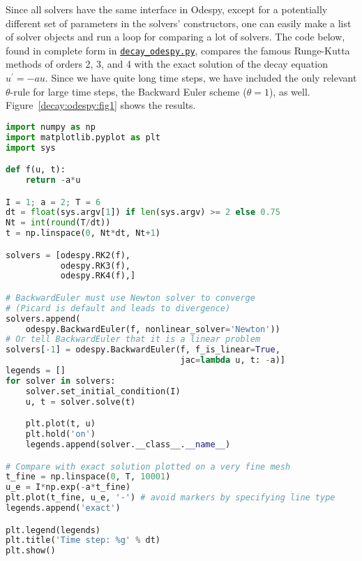 \documentclass[graybox,sectrefs,envcountresetchap,open=right,final]{svmonodo}
\begin{document}
Since all solvers have the same interface in Odespy, except for a
potentially different set of
parameters in the solvers' constructors, one can easily make a list of
solver objects and run a loop for comparing a lot of solvers. The
code below, found in complete form in \href{{http://tinyurl.com/ofkw6kc/genz/decay_odespy.py}}{\nolinkurl{decay_odespy.py}},
compares the famous Runge-Kutta methods of orders 2, 3, and 4
with the exact solution of the decay equation
$u^{\prime}=-au$.
Since we have quite long time steps, we have included the only
relevant $\theta$-rule for large time steps, the Backward Euler scheme
($\theta=1$), as well.
Figure~\ref{decay:odespy:fig1} shows the results.











































\begin{lstlisting}[language=python,style=blue1_bluegreen]
import numpy as np
import matplotlib.pyplot as plt
import sys

def f(u, t):
    return -a*u

I = 1; a = 2; T = 6
dt = float(sys.argv[1]) if len(sys.argv) >= 2 else 0.75
Nt = int(round(T/dt))
t = np.linspace(0, Nt*dt, Nt+1)

solvers = [odespy.RK2(f),
           odespy.RK3(f),
           odespy.RK4(f),]

# BackwardEuler must use Newton solver to converge
# (Picard is default and leads to divergence)
solvers.append(
    odespy.BackwardEuler(f, nonlinear_solver='Newton'))
# Or tell BackwardEuler that it is a linear problem
solvers[-1] = odespy.BackwardEuler(f, f_is_linear=True,
                                   jac=lambda u, t: -a)]
legends = []
for solver in solvers:
    solver.set_initial_condition(I)
    u, t = solver.solve(t)

    plt.plot(t, u)
    plt.hold('on')
    legends.append(solver.__class__.__name__)

# Compare with exact solution plotted on a very fine mesh
t_fine = np.linspace(0, T, 10001)
u_e = I*np.exp(-a*t_fine)
plt.plot(t_fine, u_e, '-') # avoid markers by specifying line type
legends.append('exact')

plt.legend(legends)
plt.title('Time step: %g' % dt)
plt.show()

\end{lstlisting}
\end{document}

